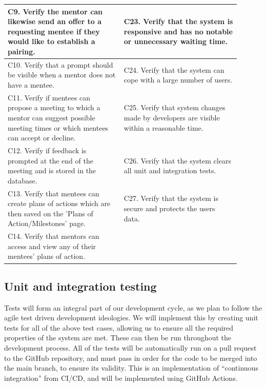 \documentclass[10pt]{article}
\begin{document}
\begin{longtable}{|p{0.45\linewidth}||p{0.45\linewidth}|}
    C9. Verify the mentor can likewise send an offer to a requesting mentee if they would like to establish a pairing.
    &
    C23. Verify that the system is responsive and has no notable or unnecessary waiting time.
    \\ \hline

    C10. Verify that a prompt should be visible when a mentor does not have a mentee.
    &
    C24. Verify that the system can cope with a large number of users.
    \\ \hline

    C11. Verify if mentees can propose a meeting to which a mentor can suggest possible meeting times or which mentees can accept or decline.
    &
    C25. Verify that system changes made by developers are visible within a reasonable time.
    \\ \hline

    C12. Verify if feedback is prompted at the end of the meeting and is stored in the database.
    &
    C26. Verify that the system clears all unit and integration tests.
    \\ \hline

    C13. Verify that mentees can create plans of actions which are then saved on the 'Plans of Action/Milestones' page.
    &
    C27. Verify that the system is secure and protects the users data.
    \\ \hline

    C14. Verify that mentors can access and view any of their mentees' plans of action.
    & \\ \hline

\end{longtable}



\subsection{Unit and integration testing}
Tests will form an integral part of our development cycle, as we plan to follow
the agile test driven development ideologies. We will implement this by creating
unit tests for all of the above test cases, allowing us to ensure all the
required properties of the system are met. These can then be run throughout the
development process. All of the tests will be automatically run on a pull
request to the GitHub repository, and must pass in order for the code to be
merged into the main branch, to ensure its validity. This is an implementation
of ``continuous integration'' from CI/CD, and will be implemented using GitHub
Actions.
\end{document}
